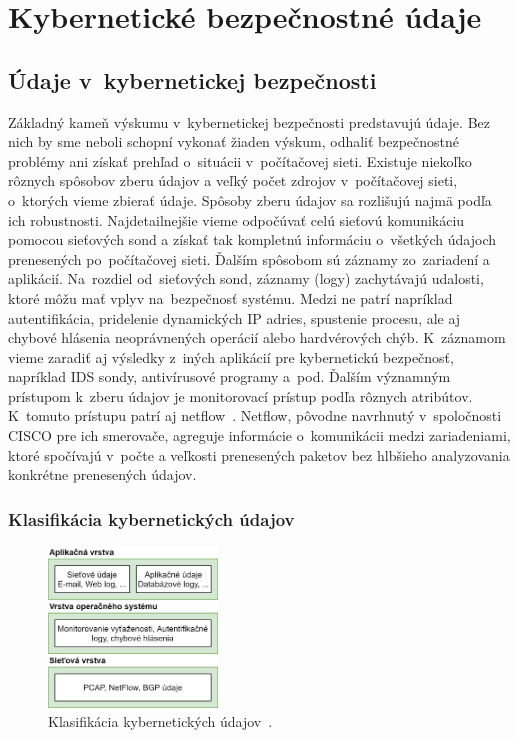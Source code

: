 \documentclass[thesismargins, thesislinespacing, openright, upjsfrontpage]{rnthesis}
\begin{document}
\chapter{Kybernetické bezpečnostné údaje}

\section{Údaje v~kybernetickej bezpečnosti}

Základný kameň výskumu v~kybernetickej bezpečnosti predstavujú údaje. Bez nich by sme neboli schopní vykonať žiaden výskum, odhaliť bezpečnostné problémy ani získať prehľad o~situácii v~počítačovej sieti. Existuje niekoľko rôznych spôsobov zberu údajov a veľký počet zdrojov v~počítačovej sieti, o~ktorých vieme zbierať údaje. Spôsoby zberu údajov sa rozlišujú najmä podľa ich robustnosti. Najdetailnejšie vieme odpočúvať celú sieťovú komunikáciu pomocou sieťových sond a získať tak kompletnú informáciu o~všetkých údajoch prenesených po~počítačovej sieti. Ďalším spôsobom sú záznamy zo~zariadení a aplikácií. Na~rozdiel od~sieťových sond, záznamy (logy) zachytávajú udalosti, ktoré môžu mať vplyv na~bezpečnosť systému. Medzi ne patrí napríklad autentifikácia, pridelenie dynamických IP adries, spustenie procesu, ale aj chybové hlásenia neoprávnených operácií alebo hardvérových chýb. K~záznamom vieme zaradiť aj výsledky z~iných aplikácií pre kybernetickú bezpečnosť, napríklad IDS sondy, antivírusové programy a~pod. Ďalším významným prístupom k~zberu údajov je monitorovací prístup podľa rôznych atribútov. K~tomuto prístupu patrí aj netflow~\cite{claise2004cisco}. Netflow, pôvodne navrhnutý v~spoločnosti CISCO pre ich smerovače, agreguje informácie o~komunikácii medzi zariadeniami, ktoré spočívajú v~počte a veľkosti prenesených paketov bez hlbšieho analyzovania konkrétne prenesených údajov.

\subsection{Klasifikácia kybernetických údajov}\label{klasifikacia_dat}

\begin{figure}[h]
  \centering
  \includegraphics[width=0.4\textwidth]{images/cyberdata.png}
  \caption{Klasifikácia kybernetických údajov~\cite{wang2013cyber}.}
  \label{fig:cyberdata}
\end{figure}
\end{document}
